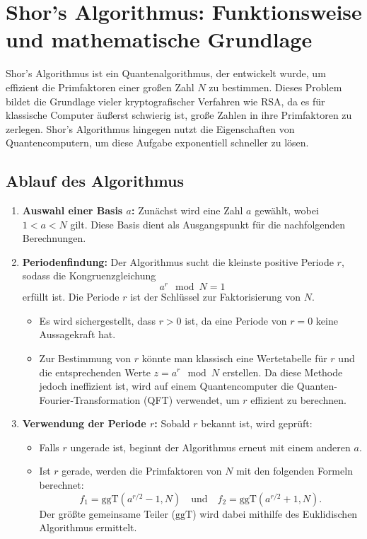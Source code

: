 \section{Shor’s Algorithmus: Funktionsweise und mathematische Grundlage}

Shor’s Algorithmus ist ein Quantenalgorithmus, der entwickelt wurde, um 
effizient die Primfaktoren einer großen Zahl $N$ zu bestimmen. Dieses 
Problem bildet die Grundlage vieler kryptografischer Verfahren wie RSA, 
da es für klassische Computer äußerst schwierig ist, große Zahlen in 
ihre Primfaktoren zu zerlegen. Shor’s Algorithmus hingegen nutzt die 
Eigenschaften von Quantencomputern, um diese Aufgabe exponentiell 
schneller zu lösen.

\subsection{Ablauf des Algorithmus}

\begin{enumerate}
    \item \textbf{Auswahl einer Basis $a$:}  
    Zunächst wird eine Zahl $a$ gewählt, wobei $1 < a < N$ gilt. Diese 
    Basis dient als Ausgangspunkt für die nachfolgenden Berechnungen.

    \item \textbf{Periodenfindung:}  
    Der Algorithmus sucht die kleinste positive Periode $r$, sodass die 
    Kongruenzgleichung  
    \[
    a^r \mod N = 1
    \]  
    erfüllt ist. Die Periode $r$ ist der Schlüssel zur Faktorisierung von $N$.  
    \begin{itemize}
        \item Es wird sichergestellt, dass $r > 0$ ist, da eine Periode von 
        $r = 0$ keine Aussagekraft hat.
        \item Zur Bestimmung von $r$ könnte man klassisch eine Wertetabelle 
        für $r$ und die entsprechenden Werte $z = a^r \mod N$ erstellen. Da 
        diese Methode jedoch ineffizient ist, wird auf einem Quantencomputer 
        die Quanten-Fourier-Transformation (QFT) verwendet, um $r$ effizient 
        zu berechnen.
    \end{itemize}

    \item \textbf{Verwendung der Periode $r$:}  
    Sobald $r$ bekannt ist, wird geprüft:  
    \begin{itemize}
        \item Falls $r$ ungerade ist, beginnt der Algorithmus erneut mit 
        einem anderen $a$.
        \item Ist $r$ gerade, werden die Primfaktoren von $N$ mit den 
        folgenden Formeln berechnet:  
        \[
        f_1 = \text{ggT}\left(a^{r/2} - 1, N\right) \quad \text{und} \quad f_2 = \text{ggT}\left(a^{r/2} + 1, N\right).
        \]  
        Der größte gemeinsame Teiler ($\text{ggT}$) wird dabei mithilfe 
        des Euklidischen Algorithmus ermittelt.
    \end{itemize}
\end{enumerate}

